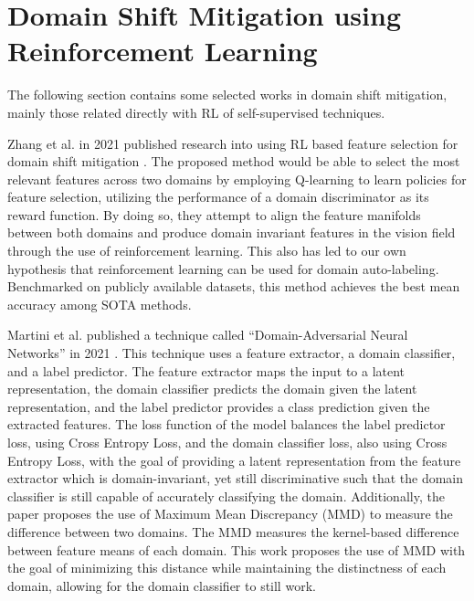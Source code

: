 \section{Domain Shift Mitigation using Reinforcement Learning}

The following section contains some selected works in domain shift mitigation, mainly those related directly with RL of self-supervised techniques.

Zhang et al. in 2021 published research into using RL based feature selection for domain shift mitigation \cite{zhang2021adversarial}.
The proposed method would be able to select the most relevant features across two domains by employing Q-learning to learn policies for feature selection, utilizing the performance of a domain discriminator as its reward function.
By doing so, they attempt to align the feature manifolds between both domains and produce domain invariant features in the vision field through the use of reinforcement learning.
This also has led to our own hypothesis that reinforcement learning can be used for domain auto-labeling.
Benchmarked on publicly available datasets, this method achieves the best mean accuracy among SOTA methods.

Martini et al. published a technique called ``Domain-Adversarial Neural Networks'' in 2021 \cite{martini2021domain}.
This technique uses a feature extractor, a domain classifier, and a label predictor.
The feature extractor maps the input to a latent representation, the domain classifier predicts the domain given the latent representation, and the label predictor provides a class prediction given the extracted features.
The loss function of the model balances the label predictor loss, using Cross Entropy Loss, and the domain classifier loss, also using Cross Entropy Loss, with the goal of providing a latent representation from the feature extractor which is domain-invariant, yet still discriminative such that the domain classifier is still capable of accurately classifying the domain.
Additionally, the paper proposes the use of Maximum Mean Discrepancy (MMD) to measure the difference between two domains.
The MMD measures the kernel-based difference between feature means of each domain.
This work proposes the use of MMD with the goal of minimizing this distance while maintaining the distinctness of each domain, allowing for the domain classifier to still work.

